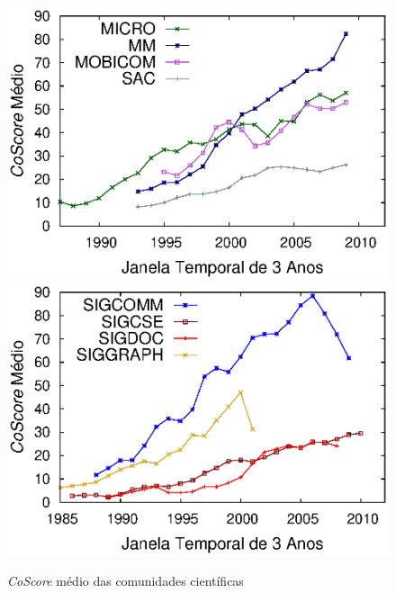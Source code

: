 \begin{figure}[!htb]
\begin{center}
    \includegraphics[scale=.6]{../graficos/average_core_score/pt_BR/average_core_score_slide_window_grupo_5_temporal_web.eps}
    \includegraphics[scale=.6]{../graficos/average_core_score/pt_BR/average_core_score_slide_window_grupo_6_temporal_web.eps}
  \end{center}
  \caption{\textit{CoScore} médio das comunidades científicas}
  \label{fig:average_core_score_apendice}
\end{figure}